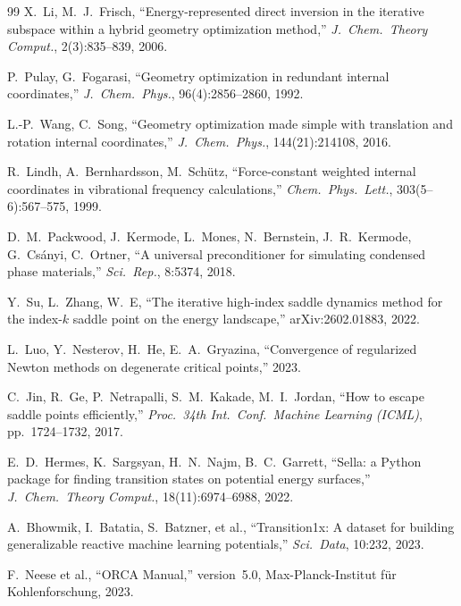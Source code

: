 \documentclass[11pt,a4paper]{article}
\theoremstyle{definition}
\begin{document}
\begin{thebibliography}{99}
  X.~Li, M.~J.~Frisch,
  ``Energy-represented direct inversion in the iterative subspace within a
  hybrid geometry optimization method,''
  \emph{J.\ Chem.\ Theory Comput.}, 2(3):835--839, 2006.

  P.~Pulay, G.~Fogarasi,
  ``Geometry optimization in redundant internal coordinates,''
  \emph{J.\ Chem.\ Phys.}, 96(4):2856--2860, 1992.

  L.-P.~Wang, C.~Song,
  ``Geometry optimization made simple with translation and rotation
  internal coordinates,''
  \emph{J.\ Chem.\ Phys.}, 144(21):214108, 2016.

  R.~Lindh, A.~Bernhardsson, M.~Sch\"utz,
  ``Force-constant weighted internal coordinates in vibrational frequency
  calculations,''
  \emph{Chem.\ Phys.\ Lett.}, 303(5--6):567--575, 1999.

  D.~M.~Packwood, J.~Kermode, L.~Mones, N.~Bernstein, J.~R.~Kermode,
  G.~Cs\'anyi, C.~Ortner,
  ``A universal preconditioner for simulating condensed phase materials,''
  \emph{Sci.\ Rep.}, 8:5374, 2018.

  Y.~Su, L.~Zhang, W.~E,
  ``The iterative high-index saddle dynamics method for the index-$k$
  saddle point on the energy landscape,''
  arXiv:2602.01883, 2022.

  L.~Luo, Y.~Nesterov, H.~He, E.~A.~Gryazina,
  ``Convergence of regularized Newton methods on degenerate critical points,''
  2023.

  C.~Jin, R.~Ge, P.~Netrapalli, S.~M.~Kakade, M.~I.~Jordan,
  ``How to escape saddle points efficiently,''
  \emph{Proc.\ 34th Int.\ Conf.\ Machine Learning (ICML)}, pp.~1724--1732, 2017.

  E.~D.~Hermes, K.~Sargsyan, H.~N.~Najm, B.~C.~Garrett,
  ``Sella: a Python package for finding transition states on
  potential energy surfaces,''
  \emph{J.\ Chem.\ Theory Comput.}, 18(11):6974--6988, 2022.

  A.~Bhowmik, I.~Batatia, S.~Batzner, et al.,
  ``Transition1x: A dataset for building generalizable reactive machine
  learning potentials,''
  \emph{Sci.\ Data}, 10:232, 2023.

  F.~Neese et al., ``ORCA Manual,'' version~5.0, Max-Planck-Institut
  f\"ur Kohlenforschung, 2023.

\end{thebibliography}
\end{document}
